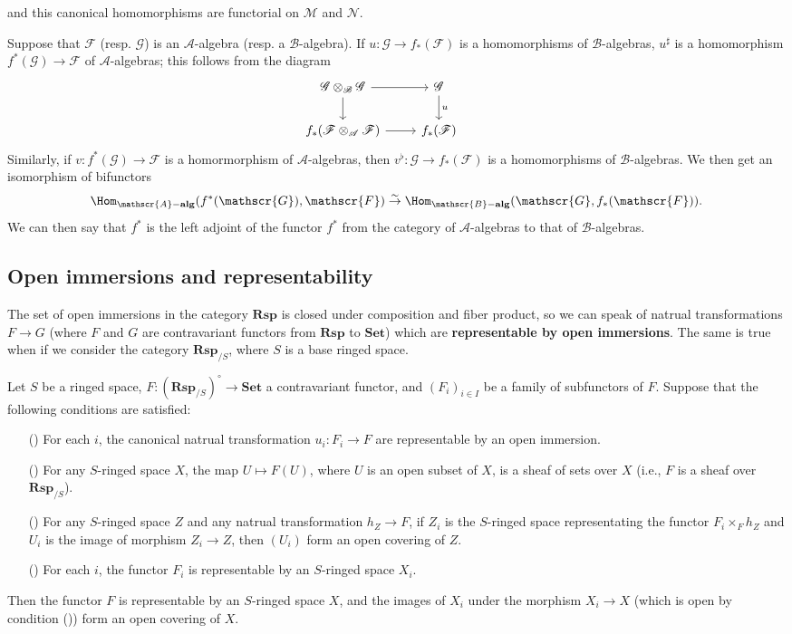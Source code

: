 and this canonical homomorphisms are functorial on $\mathscr{M}$ and $\mathscr{N}$.\par
Suppose that $\mathscr{F}$ (resp. $\mathscr{G}$) is an $\mathscr{A}$-algebra (resp. a $\mathscr{B}$-algebra). If $u:\mathscr{G}\to f_*(\mathscr{F})$ is a homomorphisms of $\mathscr{B}$-algebras, $u^{\sharp}$  is a homomorphism $f^*(\mathscr{G})\to\mathscr{F}$ of $\mathscr{A}$-algebras; this follows from the diagram
\[\begin{tikzcd}
\mathscr{G}\otimes_{\mathscr{B}}\mathscr{G}\ar[r]\ar[d]&\mathscr{G}\ar[d,"u"]&\\
f_*(\mathscr{F}\otimes_{\mathscr{A}}\mathscr{F})\ar[r]&f_*(\mathscr{F})
\end{tikzcd}\]
Similarly, if $v:f^*(\mathscr{G})\to\mathscr{F}$ is a homormorphism of $\mathscr{A}$-algebras, then $v^\flat:\mathscr{G}\to f_*(\mathscr{F})$ is a homomorphisms of $\mathscr{B}$-algebras. We then get an isomorphism of bifunctors
\[\Hom_{\mathscr{A}-\mathbf{alg}}(f^*(\mathscr{G}),\mathscr{F})\stackrel{\sim}{\to}\Hom_{\mathscr{B}-\mathbf{alg}}(\mathscr{G},f_*(\mathscr{F})).\]
We can then say that $f^*$ is the left adjoint of the functor $f^*$ from the category of $\mathscr{A}$-algebras to that of $\mathscr{B}$-algebras.
\subsection{Open immersions and representability}
The set of open immersions in the category $\mathbf{Rsp}$ is closed under composition and fiber product, so we can speak of natrual transformations $F\to G$ (where $F$ and $G$ are contravariant functors from $\mathbf{Rsp}$ to $\mathbf{Set}$) which are \textbf{representable by open immersions}. The same is true when if we consider the category $\mathbf{Rsp}_{/S}$, where $S$ is a base ringed space.
\begin{proposition}\label{ringed space representable functor via subfunctor}
Let $S$ be a ringed space, $F:(\mathbf{Rsp}_{/S})^{\circ}\to\mathbf{Set}$ a contravariant functor, and $(F_i)_{i\in I}$ be a family of subfunctors of $F$. Suppose that the following conditions are satisfied:
\begin{itemize}
\item[(\rmnum{1})] For each $i$, the canonical natrual transformation $u_i:F_i\to F$ are representable by an open immersion.
\item[(\rmnum{2})] For any $S$-ringed space $X$, the map $U\mapsto F(U)$, where $U$ is an open subset of $X$, is a sheaf of sets over $X$ (i.e., $F$ is a sheaf over $\mathbf{Rsp}_{/S}$).
\item[(\rmnum{3})] For any $S$-ringed space $Z$ and any natrual transformation $h_Z\to F$, if $Z_i$ is the $S$-ringed space representating the functor $F_i\times_Fh_Z$ and $U_i$ is the image of morphism $Z_i\to Z$, then $(U_i)$ form an open covering of $Z$. 
\item[(\rmnum{4})] For each $i$, the functor $F_i$ is representable by an $S$-ringed space $X_i$.
\end{itemize}
Then the functor $F$ is representable by an $S$-ringed space $X$, and the images of $X_i$ under the morphism $X_i\to X$ (which is open by condition ()) form an open covering of $X$.
\end{proposition}
